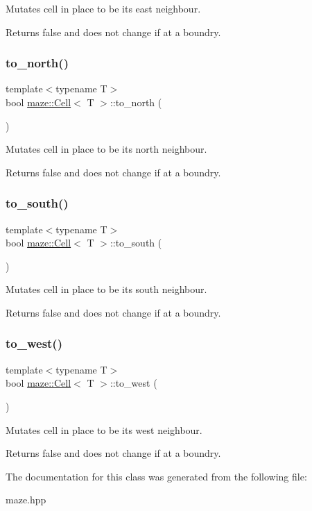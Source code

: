 Mutates cell in place to be its east neighbour. 

Returns false and does not change if at a boundry. \mbox{\label{classmaze_1_1Cell_ad7a2a4199240e33f5eca151e5ad123be}} 
\subsubsection{\texorpdfstring{to\+\_\+north()}{to\_north()}}
{\footnotesize\ttfamily template$<$typename T$>$ \\
bool \hyperlink{classmaze_1_1Cell}{maze\+::\+Cell}$<$ T $>$\+::to\+\_\+north (\begin{DoxyParamCaption}{ }\end{DoxyParamCaption})}



Mutates cell in place to be its north neighbour. 

Returns false and does not change if at a boundry. \mbox{\label{classmaze_1_1Cell_ad9ad8cbb20515ba73c92544adb3cdafd}} 
\subsubsection{\texorpdfstring{to\+\_\+south()}{to\_south()}}
{\footnotesize\ttfamily template$<$typename T$>$ \\
bool \hyperlink{classmaze_1_1Cell}{maze\+::\+Cell}$<$ T $>$\+::to\+\_\+south (\begin{DoxyParamCaption}{ }\end{DoxyParamCaption})}



Mutates cell in place to be its south neighbour. 

Returns false and does not change if at a boundry. \mbox{\label{classmaze_1_1Cell_a388cb1fd37b00e05980c08ef55b82748}} 
\subsubsection{\texorpdfstring{to\+\_\+west()}{to\_west()}}
{\footnotesize\ttfamily template$<$typename T$>$ \\
bool \hyperlink{classmaze_1_1Cell}{maze\+::\+Cell}$<$ T $>$\+::to\+\_\+west (\begin{DoxyParamCaption}{ }\end{DoxyParamCaption})}



Mutates cell in place to be its west neighbour. 

Returns false and does not change if at a boundry. 

The documentation for this class was generated from the following file\+:\begin{DoxyCompactItemize}
\item 
maze.\+hpp\end{DoxyCompactItemize}
